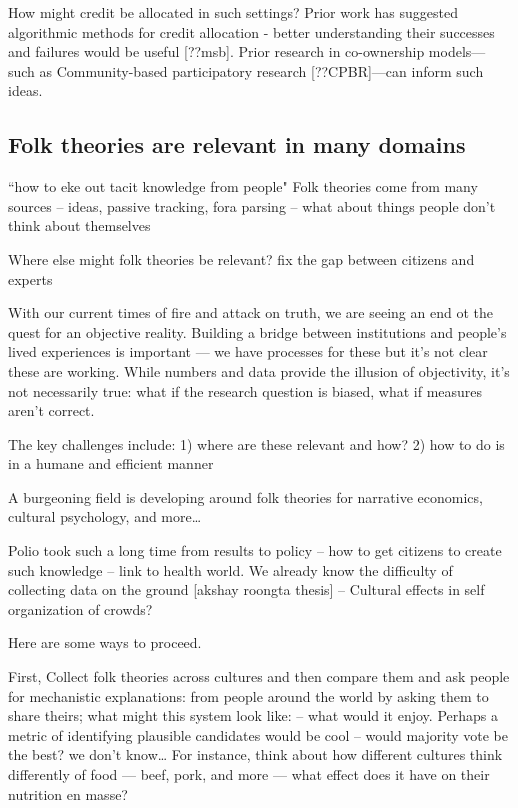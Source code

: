 How might credit be allocated in such settings? Prior work has suggested algorithmic methods for credit allocation - better understanding their successes and failures would be useful [??msb]. Prior research in co-ownership models---such as Community-based participatory research [??CPBR]---can inform such ideas.


\subsection{Folk theories are relevant in many domains}
“how to eke out tacit knowledge from people"
Folk theories come from many sources -- ideas, passive tracking, fora parsing
-- what about things people don't think about themselves

Where else might folk theories be relevant?
fix the gap between citizens and experts

With our current times of fire and attack on truth, we are seeing an end ot the quest for an objective reality. Building a bridge between institutions and people’s lived experiences is important — we have processes for these but it’s not clear these are working. While numbers and data provide the illusion of objectivity, it’s not necessarily true: what if the research question is biased, what if measures aren’t correct. 

The key challenges include: 1) where are these relevant and how? 2) how to do is in a humane and efficient manner

A burgeoning field is developing around folk theories for narrative economics, cultural psychology, and more… 

Polio took such a long time from results to policy --  how to get citizens to create such knowledge -- link to health world. We already know the difficulty of collecting data on the ground [akshay roongta thesis] -- Cultural effects in self organization of crowds?

Here are some ways to proceed.

First, Collect folk theories across cultures and then compare them and ask people for mechanistic explanations: from people around the world by asking them to share theirs; what might this system look like: -- what would it enjoy. Perhaps a metric of identifying plausible candidates would be cool -- would majority vote be the best? we don't know… For instance, think about how different cultures think differently of food — beef, pork, and more — what effect does it have on their nutrition en masse?

